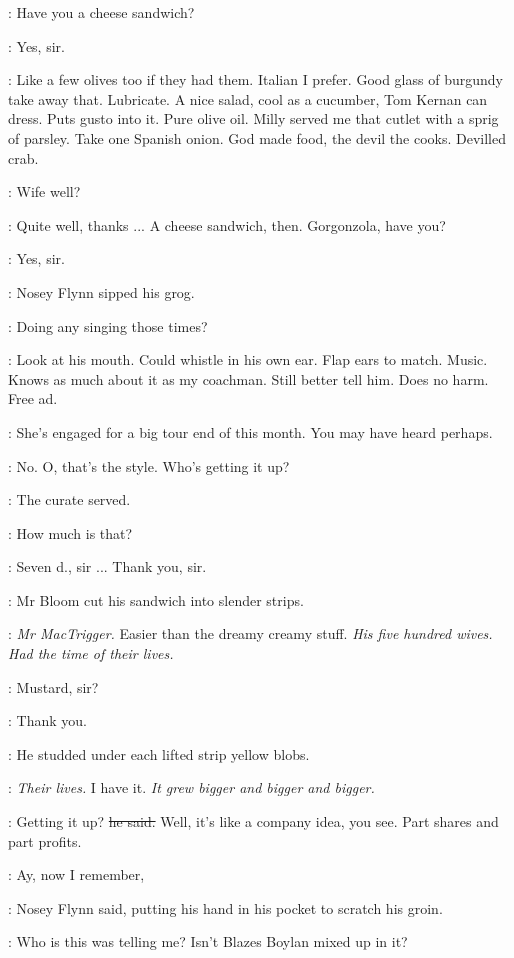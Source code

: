 \Bloom:
Have you a cheese sandwich?

\curate:
Yes,
sir.

\BloomInt:
Like a few olives too if they had them.
Italian I prefer.
Good glass of burgundy take away that.
Lubricate.
A nice salad,
cool as a cucumber,
Tom Kernan can dress.
Puts gusto into it.
Pure olive oil.
Milly served me that cutlet with a sprig of parsley.
Take one Spanish onion.
God made food,
the devil the cooks.
Devilled crab.

\nosey:
Wife well?

\Bloom:
Quite well,
thanks ...
A cheese sandwich,
then.
Gorgonzola,
have you?

\curate:
Yes,
sir.

:
Nosey Flynn sipped his grog.

\nosey:
Doing any singing those times?

\BloomInt:
Look at his mouth.
Could whistle in his own ear.
Flap ears to match.
Music.
Knows as much about it as my coachman.
Still better tell him.
Does no harm.
Free ad.

\Bloom:
She's engaged for a big tour end of this month.
You may have heard perhaps.

\nosey:
No.
O, that's the style.
Who's getting it up?

:
The curate served.

\Bloom:
How much is that?

\curate:
Seven d., sir ...
Thank you, sir.


:
Mr Bloom cut his sandwich into slender strips.

\BloomInt:
\emph{Mr MacTrigger.}
Easier than the dreamy creamy stuff.
\emph{His five hundred wives.
Had the time of their lives.}

\curate:
Mustard, sir?

\Bloom:
Thank you.

:
He studded under each lifted strip yellow blobs.

\BloomInt:
\emph{Their lives.}
I have it.
\emph{It grew bigger and bigger and bigger.}

\Bloom:
Getting it up?
\sout{he said.}
Well, it's like a company idea, you see.
Part shares and part profits.

\nosey:
Ay, now I remember,

:
Nosey Flynn said,
putting his hand in his pocket to scratch his groin.

\nosey:
Who is this was telling me?
Isn't Blazes Boylan mixed up in it?

